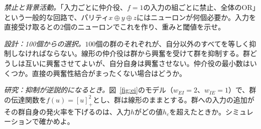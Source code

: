 \begin{exercise}[\lvlB]
\label{ex:03:6}
\emph{禁止と背景活動。}「入力ごとに仲介役、$f=1$の入力の組ごとに禁止、全体のOR」という一般的な回路で、パリティ$x\oplus y\oplus z$にはニューロンが何個必要か。入力を直接受け取るとの2個のニューロンでこれを作り、重みと閾値を示せ。
\end{exercise}

\begin{exercise}[\lvlC]
\label{ex:03:7}
\emph{設計：100個からの選択。}$100$個の群のそれぞれが、自分以外のすべてを等しく抑制しなければならない。線形の仲介役は群から興奮を受けて群を抑制する。群どうしは互いに興奮させてよいが、自分自身は興奮させない。仲介役の最小数はいくつか。直接の興奮性結合がまったくない場合はどうか。
\end{exercise}

\begin{exercise}[\lvlC]
\label{ex:03:8}
\emph{研究：抑制が逆説的になるとき。}図~\ref{fig:ei}のモデル（$w_{EI}=2$、$w_{IE}=1$）で、群の伝達関数を$f(u)=[u]_+^2$とし、群は線形のままとする。群への入力の追加がその群自身の発火率を下げるのは、入力$h$がどの値$h_c$を超えたときか。シミュレーションで確かめよ。
\end{exercise}

